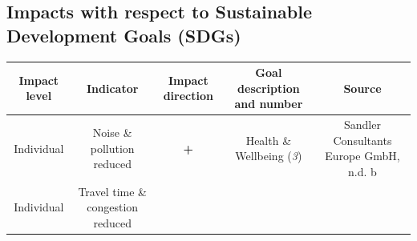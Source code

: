 \documentclass[
]{book}
\begin{document}
\hypertarget{impacts-with-respect-to-sustainable-development-goals-sdgs-8}{%
\subsection*{Impacts with respect to Sustainable Development Goals (SDGs)}\label{impacts-with-respect-to-sustainable-development-goals-sdgs-8}}

\begin{longtable}[]{@{}ccccc@{}}
\toprule
\begin{minipage}[b]{0.17\columnwidth}\centering
Impact level\strut
\end{minipage} & \begin{minipage}[b]{0.16\columnwidth}\centering
Indicator\strut
\end{minipage} & \begin{minipage}[b]{0.17\columnwidth}\centering
Impact direction\strut
\end{minipage} & \begin{minipage}[b]{0.17\columnwidth}\centering
Goal description and number\strut
\end{minipage} & \begin{minipage}[b]{0.17\columnwidth}\centering
Source\strut
\end{minipage}\tabularnewline
\midrule
\endhead
\begin{minipage}[t]{0.17\columnwidth}\centering
Individual\strut
\end{minipage} & \begin{minipage}[t]{0.16\columnwidth}\centering
Noise \& pollution reduced\strut
\end{minipage} & \begin{minipage}[t]{0.17\columnwidth}\centering
\textbf{+}\strut
\end{minipage} & \begin{minipage}[t]{0.17\columnwidth}\centering
Health \& Wellbeing (\emph{3})\strut
\end{minipage} & \begin{minipage}[t]{0.17\columnwidth}\centering
Sandler Consultants Europe GmbH, n.d. b\strut
\end{minipage}\tabularnewline
\begin{minipage}[t]{0.17\columnwidth}\centering
Individual\strut
\end{minipage} & \begin{minipage}[t]{0.16\columnwidth}\centering
Travel time \& congestion reduced\strut

\end{minipage}
\end{longtable}
\end{document}

